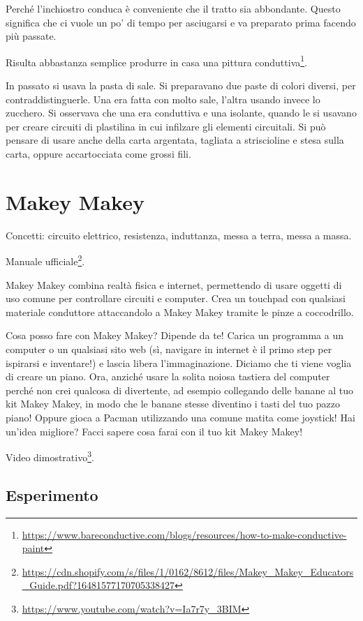 \documentclass[a4paper]{article}
\begin{document}
Perché l'inchiostro conduca è conveniente che il tratto sia abbondante. Questo
significa che ci vuole un po' di tempo per asciugarsi e va preparato prima
facendo più passate.

Risulta abbastanza semplice produrre in casa una pittura conduttiva\footnote{
  \url{https://www.bareconductive.com/blogs/resources/how-to-make-conductive-paint}
}.

In passato si usava la pasta di sale. Si preparavano due paste di colori
diversi, per contraddistinguerle. Una era fatta con molto sale, l'altra usando
invece lo zucchero. Si osservava che una era conduttiva e una isolante, quando
le si usavano per creare circuiti di plastilina in cui infilzare gli elementi
circuitali. Si può pensare di usare anche della carta argentata, tagliata a
striscioline e stesa sulla carta, oppure accartocciata come grossi fili.

\section{Makey Makey}%
\label{sec:makeymakey}

Concetti: circuito elettrico, resistenza, induttanza, messa a terra, messa a
massa.

Manuale ufficiale\footnote{
  \url{https://cdn.shopify.com/s/files/1/0162/8612/files/Makey_Makey_Educators_Guide.pdf?16481577170705338427}
}.

Makey Makey combina realtà fisica e internet, permettendo di usare oggetti di
uso comune per controllare circuiti e computer. Crea un touchpad con qualsiasi
materiale conduttore attaccandolo a Makey Makey tramite le pinze a coccodrillo.

Cosa posso fare con Makey Makey? Dipende da te! Carica un programma a un
computer o un qualsiasi sito web (sì, navigare in internet è il primo step per
ispirarsi e inventare!) e lascia libera l'immaginazione. Diciamo che ti viene
voglia di creare un piano. Ora, anziché usare la solita noiosa tastiera del
computer perché non crei qualcosa di divertente, ad esempio collegando delle
banane al tuo kit Makey Makey, in modo che le banane stesse diventino i tasti
del tuo pazzo piano! Oppure gioca a Pacman utilizzando una comune matita come
joystick! Hai un'idea migliore? Facci sapere cosa farai con il tuo kit Makey
Makey!

Video dimostrativo\footnote{ \url{https://www.youtube.com/watch?v=Ia7r7y_3BIM}
}.

\subsection{Esperimento}%
\label{subsec:makeymakey-esperimento}
\end{document}
